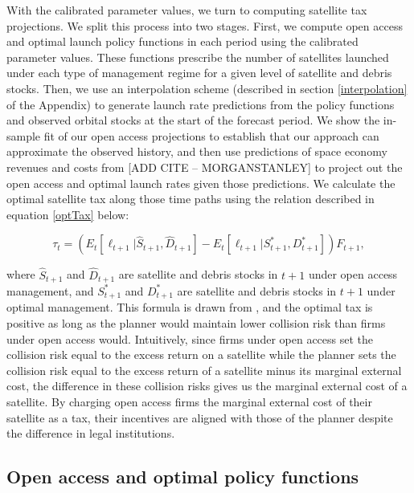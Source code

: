 \documentclass[12pt]{article}
\begin{document}
With the calibrated parameter values, we turn to computing satellite tax projections. We split this process into two stages. First, we compute open access and optimal launch policy functions in each period using the calibrated parameter values. These functions prescribe the number of satellites launched under each type of management regime for a given level of satellite and debris stocks. Then, we use an interpolation scheme (described in section \ref{interpolation} of the Appendix) to generate launch rate predictions from the policy functions and observed orbital stocks at the start of the forecast period. We show the in-sample fit of our open access projections to establish that our approach can approximate the observed history, and then use predictions of space economy revenues and costs from [ADD CITE -- MORGANSTANLEY] to project out the open access and optimal launch rates given those predictions. We calculate the optimal satellite tax along those time paths using the relation described in equation \ref{optTax} below:

\begin{equation}
\label{optTax}
	\tau_t = (E_t[\ell_{t+1}|\hat{S}_{t+1},\hat{D}_{t+1}] - E_t[\ell_{t+1}|S^*_{t+1},D^*_{t+1}])F_{t+1},
\end{equation}

where $\hat{S}_{t+1}$ and $\hat{D}_{t+1}$ are satellite and debris stocks in $t+1$ under open access management, and $S^*_{t+1}$ and $D^*_{t+1}$ are satellite and debris stocks in $t+1$ under optimal management. This formula is drawn from \cite{raorondinaWP}, and the optimal tax is positive as long as the planner would maintain lower collision risk than firms under open access would. Intuitively, since firms under open access set the collision risk equal to the excess return on a satellite while the planner sets the collision risk equal to the excess return of a satellite minus its marginal external cost, the difference in these collision risks gives us the marginal external cost of a satellite. By charging open access firms the marginal external cost of their satellite as a tax, their incentives are aligned with those of the planner despite the difference in legal institutions.

\subsection{Open access and optimal policy functions}
\end{document}
